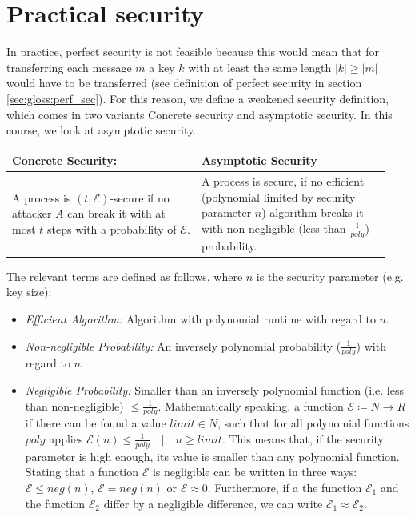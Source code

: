 \section{Practical security}

In practice, perfect security is not feasible because this would mean that for transferring each message $m$ a key $k$ with at least the same length $|k| \geq |m|$ would have to be transferred (see definition of perfect security in section \ref{sec:gloss:perf_sec}). For this reason, we define a weakened security definition, which comes in two variants \textendash{} Concrete security and asymptotic security. In this course, we look at asymptotic security.

\begin{tabular}{|p{0.47\linewidth}|p{0.47\linewidth}|}
    \hline
    \textbf{Concrete Security:}                                                                                                       & \textbf{Asymptotic Security}                                                                                                                                          \\
    \hline
    A process is $(t,\mathcal{E})$-secure if no attacker $A$ can break it with at most $t$ steps with a probability of $\mathcal{E}$. & A process is secure, if no efficient (polynomial limited by security parameter $n$) algorithm breaks it with non-negligible (less than $\frac{1}{poly}$) probability. \\
    \hline
\end{tabular}

The relevant terms are defined as follows, where $n$ is the security parameter (e.g. key size):

\begin{itemize}
    \item \textit{Efficient Algorithm:} Algorithm with polynomial runtime with regard to $n$.
    \item \textit{Non-negligible Probability:} An inversely polynomial probability ($\frac{1}{poly}$) with regard to $n$.
    \item \textit{Negligible Probability:} Smaller than an inversely polynomial function (i.e. less than non-negligible) $\leq \frac{1}{poly}$. Mathematically speaking, a function $\mathcal{E} \coloneqq N \rightarrow R$ if there can be found a value $limit \in N$, such that for all polynomial functions $poly$ applies $\mathcal{E}(n) \leq \frac{1}{poly} \quad|\quad n \ge limit$. This means that, if the security parameter is high enough, its value is smaller than any polynomial function. Stating that a function $\mathcal{E}$ is negligible can be written in three ways: $\mathcal{E} \leq neg(n)$, $\mathcal{E} = neg(n)$ or $\mathcal{E} \approx 0$. Furthermore, if a the function $\mathcal{E}_{1}$ and the function $\mathcal{E}_{2}$ differ by a negligible difference, we can write $\mathcal{E}_{1} \approx \mathcal{E}_{2}$.
\end{itemize}

